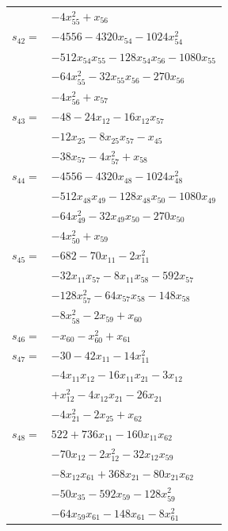 \begin{longtable}{@{}r@{\;}l@{}}
 & \(\displaystyle -4x_{55}^{2} +x_{56}\) \\[3pt]
\(s_{42}=\) & \(\displaystyle -4556 -4320x_{54} -1024x_{54}^{2}\) \\
 & \(\displaystyle -512x_{54}x_{55} -128x_{54}x_{56} -1080x_{55}\) \\
 & \(\displaystyle -64x_{55}^{2} -32x_{55}x_{56} -270x_{56}\) \\
 & \(\displaystyle -4x_{56}^{2} +x_{57}\) \\[3pt]
\(s_{43}=\) & \(\displaystyle -48 -24x_{12} -16x_{12}x_{57}\) \\
 & \(\displaystyle -12x_{25} -8x_{25}x_{57} -x_{45}\) \\
 & \(\displaystyle -38x_{57} -4x_{57}^{2} +x_{58}\) \\[3pt]
\(s_{44}=\) & \(\displaystyle -4556 -4320x_{48} -1024x_{48}^{2}\) \\
 & \(\displaystyle -512x_{48}x_{49} -128x_{48}x_{50} -1080x_{49}\) \\
 & \(\displaystyle -64x_{49}^{2} -32x_{49}x_{50} -270x_{50}\) \\
 & \(\displaystyle -4x_{50}^{2} +x_{59}\) \\[3pt]
\(s_{45}=\) & \(\displaystyle -682 -70x_{11} -2x_{11}^{2}\) \\
 & \(\displaystyle -32x_{11}x_{57} -8x_{11}x_{58} -592x_{57}\) \\
 & \(\displaystyle -128x_{57}^{2} -64x_{57}x_{58} -148x_{58}\) \\
 & \(\displaystyle -8x_{58}^{2} -2x_{59} +x_{60}\) \\[3pt]
\(s_{46}=\) & \(\displaystyle -x_{60} -x_{60}^{2} +x_{61}\) \\[3pt]
\(s_{47}=\) & \(\displaystyle -30 -42x_{11} -14x_{11}^{2}\) \\
 & \(\displaystyle -4x_{11}x_{12} -16x_{11}x_{21} -3x_{12}\) \\
 & \(\displaystyle +x_{12}^{2} -4x_{12}x_{21} -26x_{21}\) \\
 & \(\displaystyle -4x_{21}^{2} -2x_{25} +x_{62}\) \\[3pt]
\(s_{48}=\) & \(\displaystyle 522 +736x_{11} -160x_{11}x_{62}\) \\
 & \(\displaystyle -70x_{12} -2x_{12}^{2} -32x_{12}x_{59}\) \\
 & \(\displaystyle -8x_{12}x_{61} +368x_{21} -80x_{21}x_{62}\) \\
 & \(\displaystyle -50x_{35} -592x_{59} -128x_{59}^{2}\) \\
 & \(\displaystyle -64x_{59}x_{61} -148x_{61} -8x_{61}^{2}\) \\

\end{longtable}
